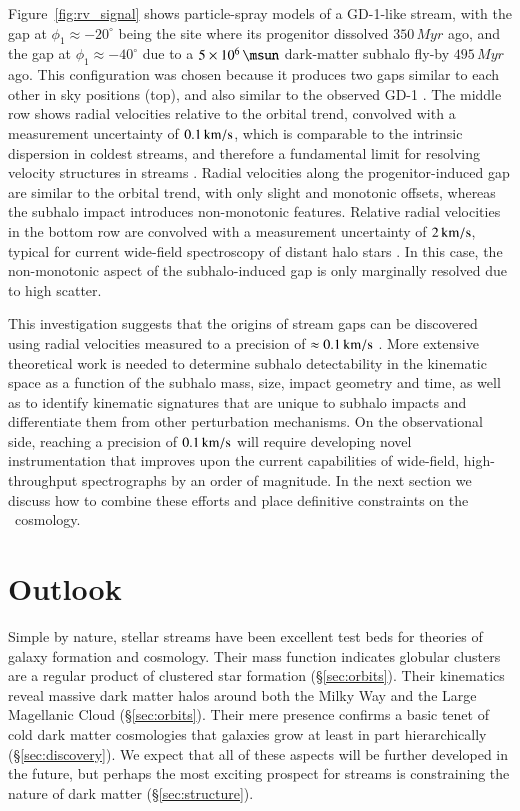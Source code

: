 \documentclass[final,5p,times,twocolumn,authoryear]{elsarticle}
\begin{document}
Figure~\ref{fig:rv_signal} shows particle-spray models of a GD-1-like stream, with the gap at $\phi_1\approx-20^\circ$ being the site where its progenitor dissolved $350\,\unit{Myr}$ ago, and the gap at $\phi_1\approx-40^\circ$ due to a $5\times10^6\,\unit{\msun}$ dark-matter subhalo fly-by $495\,\unit{Myr}$ ago.
This configuration was chosen because it produces two gaps similar to each other in sky positions (top), and also similar to the observed GD-1 \citep[e.g.,][]{price-whelan:2018}.
The middle row shows radial velocities relative to the orbital trend, convolved with a measurement uncertainty of $0.1\,\unit{\kms}$, which is comparable to the intrinsic dispersion in coldest streams, and therefore a fundamental limit for resolving velocity structures in streams \citep{erkal}.
Radial velocities along the progenitor-induced gap are similar to the orbital trend, with only slight and monotonic offsets, whereas the subhalo impact introduces non-monotonic features.
Relative radial velocities in the bottom row are convolved with a measurement uncertainty of $2\,\unit{\kms}$, typical for current wide-field spectroscopy of distant halo stars \citep[e.g.,][]{li:, desi:, boss}.
In this case, the non-monotonic aspect of the subhalo-induced gap is only marginally resolved due to high scatter.

This investigation suggests that the origins of stream gaps can be discovered using radial velocities measured to a precision of $\approx0.1\,\unit{\kms}$ \citep[similar to findings by][]{erkal:}.
More extensive theoretical work is needed to determine subhalo detectability in the kinematic space as a function of the subhalo mass, size, impact geometry and time, as well as to identify kinematic signatures that are unique to subhalo impacts and differentiate them from other perturbation mechanisms.
On the observational side, reaching a precision of $0.1\,\unit{\kms}$ will require developing novel instrumentation that improves upon the current capabilities of wide-field, high-throughput spectrographs by an order of magnitude.
In the next section we discuss how to combine these efforts and place definitive constraints on the \lcdm\ cosmology.


\section{Outlook}
\label{sec:outlook}

Simple by nature, stellar streams have been excellent test beds for theories of galaxy formation and cosmology.
Their mass function indicates globular clusters are a regular product of clustered star formation (\S\ref{sec:orbits}).
Their kinematics reveal massive dark matter halos around both the Milky Way and the Large Magellanic Cloud (\S\ref{sec:orbits}).
Their mere presence confirms a basic tenet of cold dark matter cosmologies that galaxies grow at least in part hierarchically (\S\ref{sec:discovery}).
We expect that all of these aspects will be further developed in the future, but perhaps the most exciting prospect for streams is constraining the nature of dark matter (\S\ref{sec:structure}).
\end{document}
